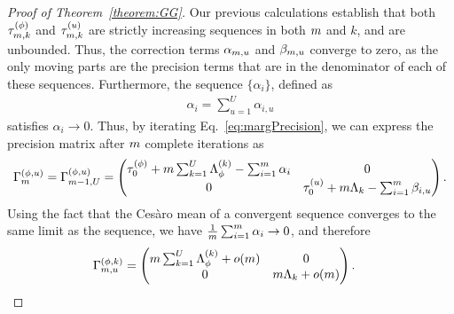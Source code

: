 \documentclass[12pt]{article}\usepackage[]{graphicx}\usepackage[]{xcolor}
\begin{document}
\begin{appendices}
\begin{proof}[Proof of Theorem~\ref{theorem:GG}]
Our previous calculations establish that both $\tau^{(\phi)}_{m, k}$ and $\tau^{(u)}_{m, k}$ are strictly increasing sequences in both $m$ and $k$, and are unbounded.
Thus, the correction terms $\alpha_{m, u}$ and $\beta_{m, u}$ converge to zero, as the only moving parts are the precision terms that are in the denominator of each of these sequences.
Furthermore, the sequence $\{\alpha_i\}$, defined as
\begin{align*}
  \alpha_i = \sum_{u = 1}^U \alpha_{i, u}
\end{align*}
satisfies $\alpha_i \rightarrow 0$.
Thus, by iterating Eq.~\ref{eq:margPrecision}, we can express the precision matrix after $m$ complete iterations as
\begin{align*}
  \Gamma^{(\phi, u)}_{m} = \Gamma^{(\phi, u)}_{m-1, U} = \begin{pmatrix}
    \tau^{(\phi)}_{0} + m\sum_{k = 1}^{U}\Lambda^{(k)}_{\phi} - \sum_{i = 1}^m\alpha_{i} & 0 \\
    0 & \tau^{(u)}_{0} + m\Lambda_{k} - \sum_{i = 1}^m \beta_{i, u}
  \end{pmatrix}.
\end{align*}
Using the fact that the Ces\`aro mean of a convergent sequence converges to the same limit as the sequence, we have $\frac{1}{m}\sum_{i = 1}^m \alpha_{i} \rightarrow 0$, and therefore
\begin{align}
  \Gamma^{(\phi, k)}_{m, u} &= \begin{pmatrix}
    m\sum_{k = 1}^U \Lambda_{\phi}^{(k)} + o(m) & 0 \\
    0 & m\Lambda_k + o(m)
  \end{pmatrix}. \label{eq:nGamma}
\end{align}


\end{proof}
\end{appendices}
\end{document}
